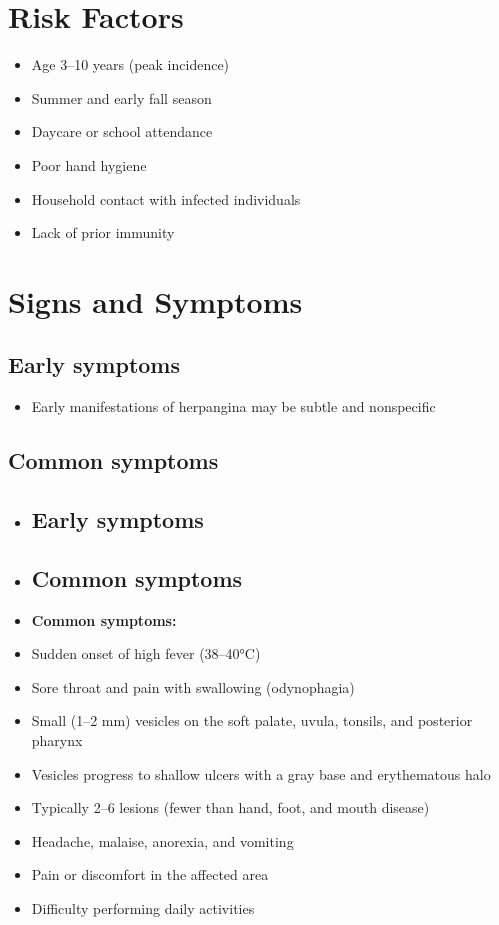 \section{Risk Factors}

\begin{itemize}[noitemsep]
  \item Age 3--10 years (peak incidence)
  \item Summer and early fall season
  \item Daycare or school attendance
  \item Poor hand hygiene
  \item Household contact with infected individuals
  \item Lack of prior immunity
\end{itemize}

\section{Signs and Symptoms}

\subsection{Early symptoms}
\begin{itemize}[noitemsep]
  \item Early manifestations of herpangina may be subtle and nonspecific
\end{itemize}

\subsection{Common symptoms}
\begin{itemize}[noitemsep]
  \item \subsection{Early symptoms}
  \item \subsection{Common symptoms}
  \item \textbf{Common symptoms:}
  \item Sudden onset of high fever (38--40°C)
  \item Sore throat and pain with swallowing (odynophagia)
  \item Small (1--2 mm) vesicles on the soft palate, uvula, tonsils, and posterior pharynx
  \item Vesicles progress to shallow ulcers with a gray base and erythematous halo
  \item Typically 2--6 lesions (fewer than hand, foot, and mouth disease)
  \item Headache, malaise, anorexia, and vomiting
  \item Pain or discomfort in the affected area
  \item Difficulty performing daily activities
\end{itemize}

